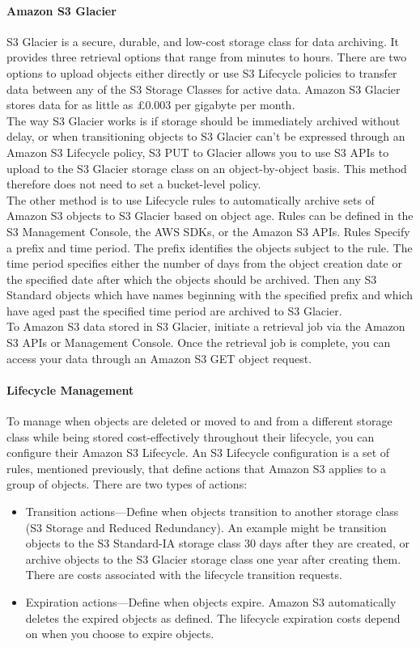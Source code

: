 \documentclass[10pt]{article}
\begin{document}
\paragraph{Amazon S3 Glacier}
S3 Glacier\cite{S3-glacier} is a secure, durable, and low-cost storage class for data archiving. It provides three retrieval options that range from minutes to hours. There are two options to upload objects either directly or use S3 Lifecycle policies to transfer data between any of the S3 Storage Classes for active data. Amazon S3 Glacier stores data for as little as £0.003 per gigabyte per month.\\
The way S3 Glacier works is if storage should be immediately archived without delay, or when transitioning objects to S3 Glacier can’t be expressed through an Amazon S3 Lifecycle policy, S3 PUT to Glacier allows you to use S3 APIs to upload to the S3 Glacier storage class on an object-by-object basis. This method therefore does not need to set a bucket-level policy.\\
The other method is to use Lifecycle rules to automatically archive sets of Amazon S3 objects to S3 Glacier based on object age. Rules can be defined in the S3 Management Console, the AWS SDKs, or the Amazon S3 APIs. Rules Specify a prefix and time period. The prefix identifies the objects subject to the rule. The time period specifies either the number of days from the object creation date or the specified date after which the objects should be archived. Then any S3 Standard objects which have names beginning with the specified prefix and which have aged past the specified time period are archived to S3 Glacier.\\
To Amazon S3 data stored in S3 Glacier, initiate a retrieval job via the Amazon S3 APIs or Management Console. Once the retrieval job is complete, you can access your data through an Amazon S3 GET object request.
\paragraph{Lifecycle Management}
To manage when objects are deleted or moved to and from a different storage class while being stored cost-effectively throughout their lifecycle, you can configure their Amazon S3 Lifecycle\cite{S3-lifecycle}. An S3 Lifecycle configuration is a set of rules, mentioned previously, that define actions that Amazon S3 applies to a group of objects. There are two types of actions:
\begin{itemize}
  \item Transition actions—Define when objects transition to another storage class (S3 Storage and Reduced Redundancy). An example might be transition objects to the S3 Standard-IA storage class 30 days after they are created, or archive objects to the S3 Glacier storage class one year after creating them. There are costs associated with the lifecycle transition requests. 
  \item Expiration actions—Define when objects expire. Amazon S3 automatically deletes the expired objects as defined. The lifecycle expiration costs depend on when you choose to expire objects. 
  \end{itemize}
\end{document}
